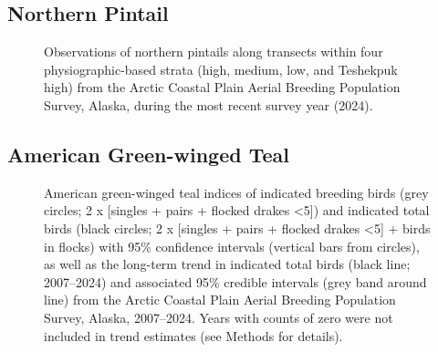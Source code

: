 \documentclass[
]{article}
\begin{document}
\endgroup{}

\newpage{}

\subsection*{Northern Pintail}\label{northern-pintail-2}

\begin{figure}


\caption{\label{fig-NOPImap}Observations of northern pintails along
transects within four physiographic-based strata (high, medium, low, and
Teshekpuk high) from the Arctic Coastal Plain Aerial Breeding Population
Survey, Alaska, during the most recent survey year (2024).}

\end{figure}%

\newpage{}

\subsection*{American Green-winged
Teal}\label{american-green-winged-teal}

\begin{figure}


\caption{\label{fig-GWTE}American green-winged teal indices of indicated
breeding birds (grey circles; 2 x {[}singles + pairs + flocked drakes
\textless5{]}) and indicated total birds (black circles; 2 x {[}singles
+ pairs + flocked drakes \textless5{]} + birds in flocks) with 95\%
confidence intervals (vertical bars from circles), as well as the
long-term trend in indicated total birds (black line; 2007--2024) and
associated 95\% credible intervals (grey band around line) from the
Arctic Coastal Plain Aerial Breeding Population Survey, Alaska,
2007--2024. Years with counts of zero were not included in trend
estimates (see Methods for details).}

\end{figure}%

\newpage{}
\end{document}
